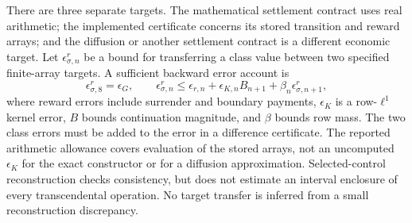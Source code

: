 There are three separate targets. The mathematical settlement contract uses real arithmetic; the implemented certificate concerns its stored transition and reward arrays; and the diffusion or another settlement contract is a different economic target. Let $\epsilon^r_{\sigma,n}$ be a bound for transferring a class value between two specified finite-array targets. A sufficient backward error account is
\begin{equation}
 \epsilon^r_{\sigma,8}=\epsilon_G,\qquad
 \epsilon^r_{\sigma,n}\leq\epsilon_{r,n}+\epsilon_{K,n}B_{n+1}
                           +\beta_n\epsilon^r_{\sigma,n+1},
 \label{eq:r9_target_error}
\end{equation}
where reward errors include surrender and boundary payments, $\epsilon_K$ is a row-$\ell^1$ kernel error, $B$ bounds continuation magnitude, and $\beta$ bounds row mass. The two class errors must be added to the error in a difference certificate. The reported arithmetic allowance covers evaluation of the stored arrays, not an uncomputed $\epsilon_K$ for the exact constructor or for a diffusion approximation. Selected-control reconstruction checks consistency, but does not estimate an interval enclosure of every transcendental operation. No target transfer is inferred from a small reconstruction discrepancy.
